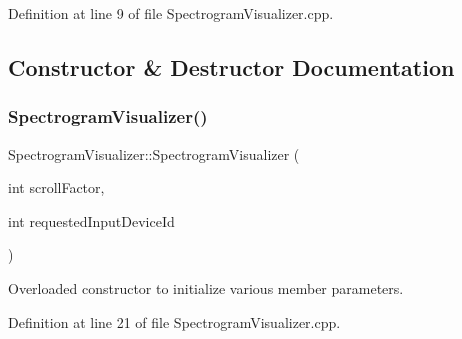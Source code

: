 Definition at line 9 of file Spectrogram\+Visualizer.\+cpp.



\subsection{Constructor \& Destructor Documentation}
\mbox{\label{structSpectrogramVisualizer_a7b971af130bf95c4f307e2add2468825}} 
\subsubsection{\texorpdfstring{Spectrogram\+Visualizer()}{SpectrogramVisualizer()}}
{\footnotesize\ttfamily Spectrogram\+Visualizer\+::\+Spectrogram\+Visualizer (\begin{DoxyParamCaption}\item[{int}]{scroll\+Factor,  }\item[{int}]{requested\+Input\+Device\+Id }\end{DoxyParamCaption})}

Overloaded constructor to initialize various member parameters. 

Definition at line 21 of file Spectrogram\+Visualizer.\+cpp.



